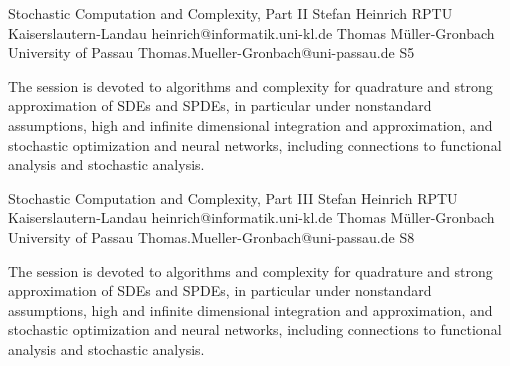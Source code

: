 

\clearpage

\begin{session}
 {Stochastic Computation and Complexity, Part II}%
 {Stefan Heinrich}%
 {RPTU Kaiserslautern-Landau}%
 {heinrich@informatik.uni-kl.de}%
 {Thomas M\"uller-Gronbach}%
 {University of Passau}%
 {Thomas.Mueller-Gronbach@uni-passau.de}%
 {S5}%
 {}%

 The session is devoted to algorithms and complexity for
 quadrature and strong approximation of SDEs and SPDEs, in particular under nonstandard assumptions,
 high and infinite dimensional integration and approximation, and
 stochastic optimization and neural networks,
 including connections to functional analysis and stochastic analysis.
 \medskip
\end{session}



\clearpage

\begin{session}
 {Stochastic Computation and Complexity, Part III}%
 {Stefan Heinrich}%
 {RPTU Kaiserslautern-Landau}%
 {heinrich@informatik.uni-kl.de}%
 {Thomas M\"uller-Gronbach}%
 {University of Passau}%
 {Thomas.Mueller-Gronbach@uni-passau.de}%
 {S8}%
 {}%

 The session is devoted to algorithms and complexity for
 quadrature and strong approximation of SDEs and SPDEs, in particular under nonstandard assumptions,
 high and infinite dimensional integration and approximation, and
 stochastic optimization and neural networks,
 including connections to functional analysis and stochastic analysis.
 \medskip
\end{session}

